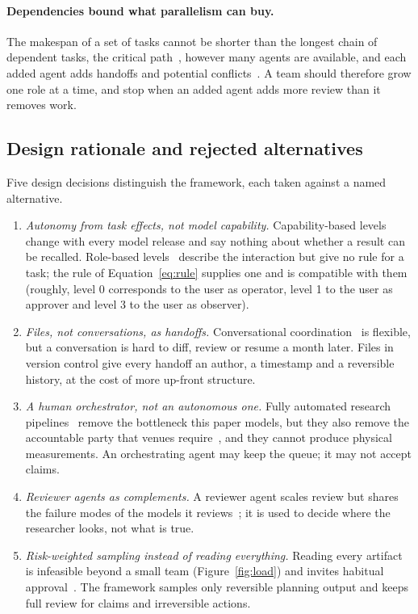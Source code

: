 \paragraph{Dependencies bound what parallelism can buy.} The makespan of a set of tasks
cannot be shorter than the longest chain of dependent tasks, the critical
path~\cite{kelley1959critical}, however many agents are available, and each added agent
adds handoffs and potential conflicts~\cite{brooks1995mythical}. A team should therefore
grow one role at a time, and stop when an added agent adds more review than it removes
work.

\subsection{Design rationale and rejected alternatives}
\label{sec:rationale}

Five design decisions distinguish the framework, each taken against a named
alternative.
\begin{enumerate}[leftmargin=*]
  \item \textit{Autonomy from task effects, not model capability.} Capability-based
    levels change with every model release and say nothing about whether a result can be
    recalled. Role-based levels~\cite{feng2025levels} describe the interaction but give no
    rule for a task; the rule of Equation~\eqref{eq:rule} supplies one and is compatible
    with them (roughly, level 0 corresponds to the user as operator, level 1 to the user
    as approver and level 3 to the user as observer).
  \item \textit{Files, not conversations, as handoffs.} Conversational
    coordination~\cite{wu2023autogen,qian2024chatdev} is flexible, but a conversation is
    hard to diff, review or resume a month later. Files in version control give every
    handoff an author, a timestamp and a reversible history, at the cost of more
    up-front structure.
  \item \textit{A human orchestrator, not an autonomous one.} Fully automated research
    pipelines~\cite{lu2024aiscientist,schmidgall2025agentlab} remove the bottleneck this
    paper models, but they also remove the accountable party that venues
    require~\cite{arxiv2025genai,thorp2023chatgpt}, and they cannot produce physical
    measurements. An orchestrating agent may keep the queue; it may not accept claims.
  \item \textit{Reviewer agents as complements.} A reviewer agent scales review but
    shares the failure modes of the models it
    reviews~\cite{zheng2023judging,sharma2023sycophancy}; it is used to decide where the
    researcher looks, not what is true.
  \item \textit{Risk-weighted sampling instead of reading everything.} Reading every
    artifact is infeasible beyond a small team (Figure~\ref{fig:load}) and invites
    habitual approval~\cite{goddard2012automation}. The framework samples only reversible
    planning output and keeps full review for claims and irreversible actions.
\end{enumerate}
